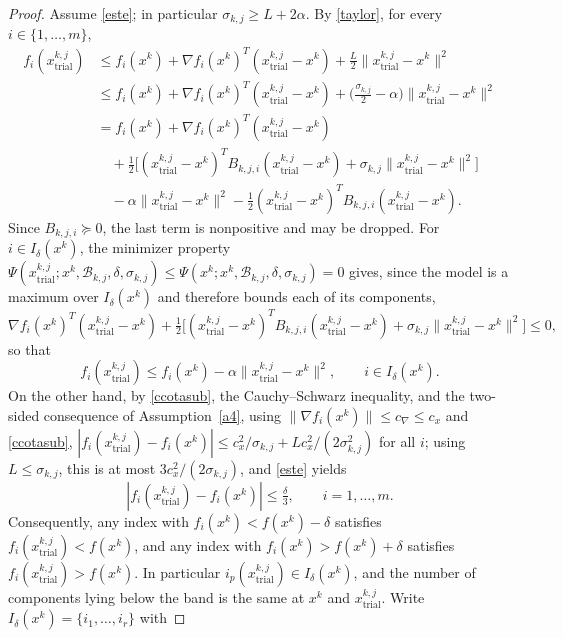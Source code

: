 \documentclass[11pt]{article}
\newcommand{\xkjtrial}{x^{k,j}_{\mathrm{trial}}}
\begin{document}
\begin{proof}
Assume \eqref{este}; in particular $\sigma_{k,j} \geq L + 2\alpha$. By
\eqref{taylor}, for every $i \in \{1, \ldots, m\}$,
\begin{align*}
f_i(\xkjtrial)
&\leq f_i(x^k) + \nabla f_i(x^k)^T(\xkjtrial - x^k)
+ \tfrac{L}{2}\|\xkjtrial - x^k\|^2 \\
&\leq f_i(x^k) + \nabla f_i(x^k)^T(\xkjtrial - x^k)
+ \Big( \tfrac{\sigma_{k,j}}{2} - \alpha \Big) \|\xkjtrial - x^k\|^2 \\
&= f_i(x^k) + \nabla f_i(x^k)^T(\xkjtrial - x^k) \\
&\quad + \tfrac{1}{2} \big[ (\xkjtrial - x^k)^T B_{k,j,i} (\xkjtrial - x^k)
+ \sigma_{k,j}\|\xkjtrial - x^k\|^2 \big] \\
&\quad - \alpha \|\xkjtrial - x^k\|^2
- \tfrac{1}{2}(\xkjtrial - x^k)^T B_{k,j,i} (\xkjtrial - x^k).
\end{align*}
Since $B_{k,j,i} \succeq 0$, the last term is nonpositive and may be dropped. For
$i \in I_\delta(x^k)$, the minimizer property
$\Psi(\xkjtrial; x^k, \mathcal{B}_{k,j}, \delta, \sigma_{k,j}) \leq
\Psi(x^k; x^k, \mathcal{B}_{k,j}, \delta, \sigma_{k,j}) = 0$ gives, since the
model is a maximum over $I_\delta(x^k)$ and therefore bounds each of its
components,
\[
\nabla f_i(x^k)^T(\xkjtrial - x^k)
+ \tfrac{1}{2} \big[ (\xkjtrial - x^k)^T B_{k,j,i} (\xkjtrial - x^k)
+ \sigma_{k,j}\|\xkjtrial - x^k\|^2 \big] \leq 0,
\]
so that
\begin{equation} \label{cota-lem2}
f_i(\xkjtrial) \leq f_i(x^k) - \alpha \|\xkjtrial - x^k\|^2, \qquad
i \in I_\delta(x^k).
\end{equation}
On the other hand, by \eqref{ccotasub}, the Cauchy--Schwarz inequality, and the
two-sided consequence of Assumption~\ref{a4}, using
$\|\nabla f_i(x^k)\| \leq c_\nabla \leq c_x$ and \eqref{ccotasub},
$|f_i(\xkjtrial) - f_i(x^k)| \leq c_x^2/\sigma_{k,j}
+ L c_x^2/(2\sigma_{k,j}^2)$ for all $i$; using $L \leq \sigma_{k,j}$, this is
at most $3c_x^2/(2\sigma_{k,j})$, and \eqref{este} yields
\begin{equation} \label{teo7eq1}
|f_i(\xkjtrial) - f_i(x^k)| \leq \tfrac{\delta}{3}, \qquad i = 1, \ldots, m.
\end{equation}
Consequently, any index with $f_i(x^k) < f(x^k) - \delta$ satisfies
$f_i(\xkjtrial) < f(x^k)$, and any index with $f_i(x^k) > f(x^k) + \delta$
satisfies $f_i(\xkjtrial) > f(x^k)$. In particular $i_p(\xkjtrial) \in
I_\delta(x^k)$, and the number of components lying below the band is the same at
$x^k$ and $\xkjtrial$. Write $I_\delta(x^k) = \{i_1, \ldots, i_r\}$ with

\end{proof}
\end{document}
